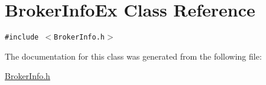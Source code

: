 \hypertarget{classBrokerInfoEx}{
\section{Broker\-Info\-Ex Class Reference}
\label{classBrokerInfoEx}
}
{\tt \#include $<$Broker\-Info.h$>$}



The documentation for this class was generated from the following file:\begin{CompactItemize}
\item 
\hyperlink{BrokerInfo_8h}{Broker\-Info.h}\end{CompactItemize}
